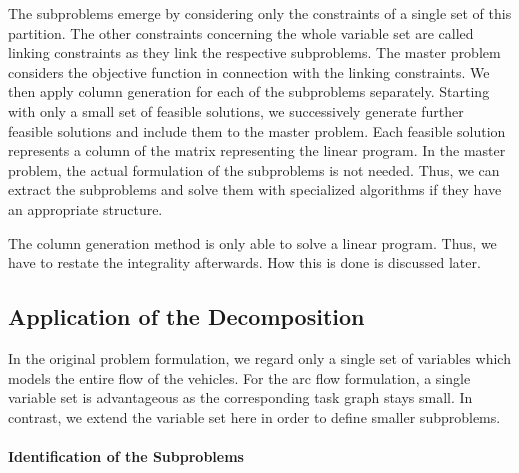 The subproblems emerge by considering only the constraints of a single set of this partition. The other constraints concerning the whole variable set are called linking constraints as they link the respective subproblems. The master problem considers the objective function in connection with the linking constraints. We then apply column generation for each of the subproblems separately. Starting with only a small set of feasible solutions, we successively generate further feasible solutions and include them to the master problem. Each feasible solution represents a column of the matrix representing the linear program. In the master problem, the actual formulation of the subproblems is not needed. Thus, we can extract the subproblems and solve them with specialized algorithms if they have an appropriate structure.

The column generation method is only able to solve a linear program. Thus, we have to restate the integrality afterwards. How this is done is discussed later.


\subsection{Application of the Decomposition}

In the original problem formulation, we regard only a single set of variables which models the entire flow of the vehicles. For the arc flow formulation, a single variable set is advantageous as the corresponding task graph stays small. In contrast, we extend the variable set here in order to define smaller subproblems.

\paragraph{Identification of the Subproblems} \parfill

